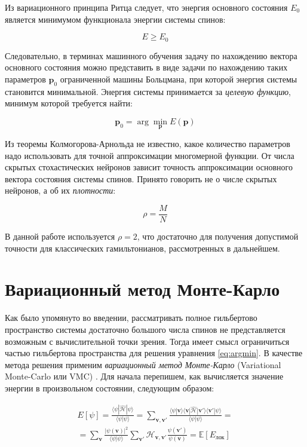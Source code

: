 Из вариационного принципа Ритца следует, что энергия основного состояния $E_0$ является минимумом функционала энергии системы спинов:

\begin{equation*}    
E\geqslant E_0
\end{equation*}

Следовательно, в терминах машинного обучения задачу по нахождению вектора основного состояния 
можно представить в виде задачи по нахождению таких параметров $ \mathbf{p}_0 $ ограниченной машины Больцмана, при которой энергия системы становится минимальной. Энергия системы принимается за \textit{целевую функцию}, минимум которой требуется найти:

\begin{equation}\label{eq:argmin}  
\mathbf{p}_0=\arg\min_{\mathbf{p}}E(\mathbf{p})
\end{equation}

Из теоремы Колмогорова-Арнольда не известно, какое количество параметров надо использовать для точной аппроксимации многомерной функции.
От числа скрытых стохастических нейронов зависит точность аппроксимации основного вектора состояния системы спинов.
Принято говорить не о числе скрытых нейронов, а об их \textit{плотности}:

\[
\rho=\frac{M}{N}
\]

В данной работе используется $\rho=2$, что достаточно для получения допустимой точности для классических гамильтонианов, рассмотренных в дальнейшем.

\section{Вариационный метод Монте-Карло}

Как было упомянуто во введении, рассматривать полное гильбертово пространство системы достаточно большого числа спинов не представляется возможным с вычислительной точки зрения.
Тогда имеет смысл ограничиться частью гильбертова пространства для решения уравнения \eqref{eq:argmin}.
В качестве метода решения применим \textit{вариационный метод Монте-Карло} (Variational Monte-Carlo или VMC) \cite{mcmillan1965ground}.
Для начала перепишем, как вычисляется значение энергии в произвольном состоянии, следующим образом:

\begin{multline}\label{eq:expectenergy}
E[\psi]=\frac{\langle \psi | \hat{\mathcal{H}} | \psi \rangle}{\langle \psi | \psi \rangle}
=\sum_{\mathbf{v}, \mathbf{v}'} \frac{\langle \psi |\mathbf{v} \rangle \langle \mathbf{v}|\hat{\mathcal{H}}| \mathbf{v}'\rangle \langle\mathbf{v}'|\psi \rangle}{\langle \psi | \psi \rangle}=\\
=\sum_{\mathbf{v}}\frac{|\psi(\mathbf{v})|^2}{\langle \psi | \psi \rangle}\sum_{\mathbf{v}'}\mathcal{H}_{\mathbf{v},\mathbf{v}'}\frac{\psi(\mathbf{v}')}{\psi(\mathbf{v})}=
\mathbb{E}[E_{\text{лок}}]
\end{multline}


